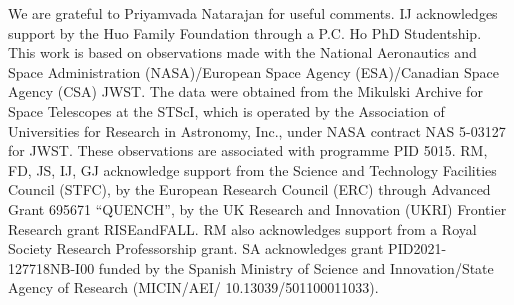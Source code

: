 \documentclass[twocolumn, fleqn]{doc_class}
\begin{document}
We are grateful to Priyamvada Natarajan for useful comments.
IJ acknowledges support by the Huo Family Foundation through a P.C. Ho PhD Studentship. 
This work is based on observations made with the National Aeronautics and Space Administration (NASA)/European Space Agency (ESA)/Canadian Space Agency (CSA) JWST. The data were obtained from the Mikulski Archive for Space Telescopes at the STScI, which is operated by the Association of Universities for Research in Astronomy, Inc., under NASA contract NAS 5-03127 for JWST. These observations are associated with programme PID 5015. RM, FD, JS, IJ, GJ acknowledge support from the Science and Technology Facilities Council (STFC), by the European Research Council (ERC) through Advanced Grant 695671 ``QUENCH'', by the UK Research and Innovation (UKRI) Frontier Research grant RISEandFALL. RM also acknowledges support from a Royal Society Research Professorship grant. SA acknowledges grant PID2021-127718NB-I00 funded by the Spanish Ministry of Science and Innovation/State Agency of Research (MICIN/AEI/ 10.13039/501100011033).
\end{document}
